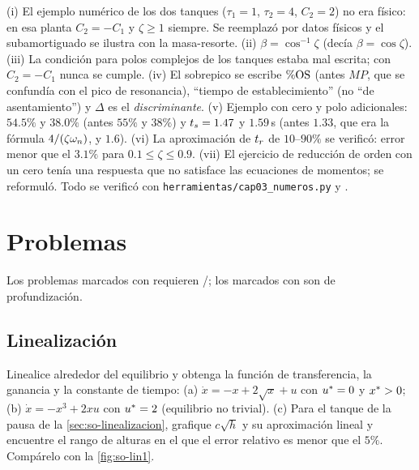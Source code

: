 \begin{profundiza}
(i) El ejemplo numérico de los dos tanques ($\tau_1=1$, $\tau_2=4$, $C_2=2$) no era físico: en esa planta $C_2=-C_1$ y $\zeta\geq1$ siempre. Se reemplazó por datos físicos y el subamortiguado se ilustra con la masa-resorte. (ii) $\beta=\cos^{-1}\zeta$ (decía $\beta=\cos\zeta$). (iii) La condición para polos complejos de los tanques estaba mal escrita; con $C_2=-C_1$ nunca se cumple. (iv) El sobrepico se escribe $\%\mathrm{OS}$ (antes $MP$, que se confundía con el pico de resonancia), ``tiempo de establecimiento'' (no ``de asentamiento'') y $\Delta$ es el \emph{discriminante}. (v) Ejemplo con cero y polo adicionales: $54.5\%$ y $38.0\%$ (antes $55\%$ y $38\%$) y $t_s=1.47$ y $1.59$\,s (antes $1.33$, que era la fórmula $4/(\zeta\omega_n)$, y $1.6$). (vi) La aproximación de $t_r$ de $10$--$90\%$ se verificó: error menor que el $3.1\%$ para $0.1\leq\zeta\leq0.9$. (vii) El ejercicio de reducción de orden con un cero tenía una respuesta que no satisface las ecuaciones de momentos; se reformuló. Todo se verificó con \texttt{herramientas/cap03\_numeros.py} y .
\end{profundiza}

\section{Problemas}
\label{sec:so-problemas}

Los problemas marcados con \etiquetaM{} requieren \matlab/\simulink; los marcados con \etiquetaEstrella{} son de profundización.

\subsection*{Linealización}

\begin{problema}[linealización]\label{prob:so-lin}
Linealice alrededor del equilibrio y obtenga la función de transferencia, la ganancia y la constante de tiempo: (a) $\dot x=-x+2\sqrt x+u$ con $u^{*}=0$ y $x^{*}>0$; (b) $\dot x=-x^3+2xu$ con $u^{*}=2$ (equilibrio no trivial). (c) \etiquetaM{} Para el tanque de la pausa de la \cref{sec:so-linealizacion}, grafique $c\sqrt h$ y su aproximación lineal y encuentre el rango de alturas en el que el error relativo es menor que el $5\%$. Compárelo con la \cref{fig:so-lin1}.
\end{problema}

